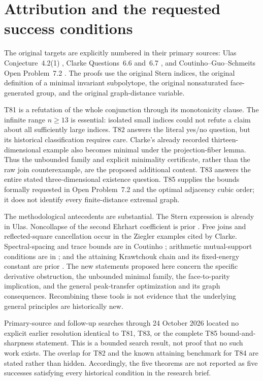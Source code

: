 \documentclass[11pt,a4paper]{article}
\theoremstyle{definition}\newtheorem{definition}[lemma]{Definition}
\theoremstyle{remark}\newtheorem{remark}[lemma]{Remark}
\begin{document}
\section{Attribution and the requested success conditions}

The original targets are explicitly numbered in their primary sources:
Ulas Conjecture~4.2(1) \cite{Ulas20}, Clarke Questions~6.6 and~6.7
\cite{Clarke26}, and Coutinho--Guo--Schmeits Open Problem~7.2
\cite{CGS25}. The proofs use the original Stern indices, the original
definition of a minimal invariant subpolytope, the original nonsaturated
face-generated group, and the original graph-distance variable.

T81 is a refutation of the whole conjunction through its monotonicity
clause. The infinite range $n\geq13$ is essential: isolated small indices
could not refute a claim about all sufficiently large indices. T82 answers
the literal yes/no question, but its historical classification requires
care. Clarke's already recorded thirteen-dimensional example also becomes
minimal under the projection-fiber lemma. Thus the unbounded family and
explicit minimality certificate, rather than the raw join counterexample,
are the proposed additional content. T83 answers the entire stated
three-dimensional existence question. T85 supplies the bounds formally
requested in Open Problem~7.2 and the optimal adjacency cubic order; it
does not identify every finite-distance extremal graph.

The methodological antecedents are substantial. The Stern expression is
already in Ulas. Noncollapse of the second Ehrhart coefficient is prior
\cite{BeckSamWoods08}. Free joins and reflected-square cancellation occur
in the Ziegler examples cited by Clarke. Spectral-spacing and trace bounds
are in Coutinho \cite{Coutinho18}; arithmetic mutual-support conditions
are in \cite{CGS25}; and the attaining Krawtchouk chain and its fixed-energy
constant are prior \cite{Christandl04,Stepanenko25}. The new statements
proposed here concern the specific derivative obstruction, the unbounded
minimal family, the face-to-parity implication, and the general peak-transfer
optimization and its graph consequences. Recombining these tools is not
evidence that the underlying general principles are historically new.

Primary-source and follow-up searches through 24 October 2026 located no
explicit earlier resolution identical to T81, T83, or the complete T85
bound-and-sharpness statement. This is a bounded search result, not proof
that no such work exists. The overlap for T82 and the known attaining
benchmark for T84 are stated rather than hidden. Accordingly, the five
theorems are not reported as five successes satisfying every historical
condition in the research brief.
\end{document}
